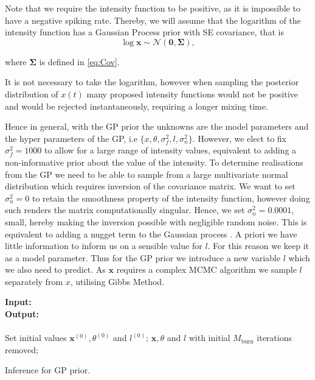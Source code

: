\documentclass[../main.tex]{subfiles}
\begin{document}
Note that we require the intensity function to be positive, as it is impossible to have a negative spiking rate. 
Thereby, we will assume that the logarithm of the intensity function has a Gaussian Process prior with SE covariance, that is 
\begin{equation}\label{eq:prior}
\log \mathbf{x} \sim \mathcal{N} ( \mathbf{0} , \mathbf{\Sigma}  ),
\end{equation}

where $\mathbf{\Sigma}$ is defined in \eqref{eq:Cov}.

It is not necessary to take the logarithm, however when sampling the posterior distribution of $x(t)$ many proposed intensity functions would not be positive and would be rejected instantaneously, requiring a longer mixing time.  

Hence in general, with the GP prior the unknowns are the model parameters and the hyper parameters of the GP, i.e $\{x, \theta, \sigma_f^2, l, \sigma_n^2 \}$. However, we elect to fix $\sigma_f^2 = 1000$ to allow for a large range of intensity values, equivalent to adding a non-informative prior about the value of the intensity. To determine realisations from the GP we need to be able to sample from a large multivariate normal distribution which requires inversion of the covariance matrix. We want to set $\sigma_n^2 = 0$ to retain the smoothness property of the intensity function, however doing such renders the matrix computationally singular. Hence, we set  $\sigma_n^2  = 0.0001$, small, hereby making the inversion possible with negligible random noise. This is equivalent to adding a nugget term to the Gaussian process \cite{Nugget}.  A priori we have little information to inform us on a sensible value for $l$. For this reason we keep it as a model parameter. Thus for the GP prior we introduce a new variable $l$ which we also need to predict.  As $\mathbf{x}$ requires a complex MCMC algorithm we sample $l$ separately from $x$, utilising Gibbs Method.

\begin{algorithm}[t]
\DontPrintSemicolon
\textbf{Input:}  \\
\textbf{Output:}  \\  \\
Set initial values $\mathbf{x}^{(0)}, \theta^{(0)}$ and $l^{(0)}$; \; 
 $\mathbf{x}, \theta$ and $l$ with initial $M_\mathrm{burn}$ iterations removed; 
\caption{Inference for GP prior.}
\end{algorithm}
\end{document}
